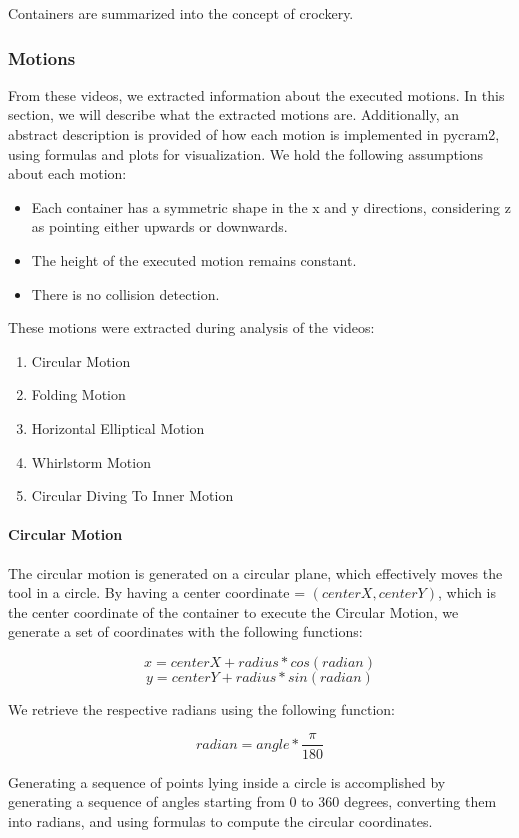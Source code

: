 Containers are summarized into the concept of crockery. 
\subsubsection{Motions}
From these videos, we extracted information about the executed motions. In this section, we will describe what the extracted motions are. 
Additionally, an abstract description is provided of how each motion is implemented in pycram2, using formulas and plots for visualization.
We hold the following assumptions about each motion:

\begin{itemize}
  \item Each container has a symmetric shape in the x and y directions, considering z as pointing either upwards or downwards.
  \item The height of the executed motion remains constant.
  \item There is no collision detection.
\end{itemize}

These motions were extracted during analysis of the videos:

\begin{enumerate}
  \item Circular Motion
  \item Folding Motion
  \item Horizontal Elliptical Motion
  \item Whirlstorm Motion
  \item Circular Diving To Inner Motion 
\end{enumerate}

\paragraph{Circular Motion}
The circular motion is generated on a circular plane, which effectively moves the tool in a circle. 
By having a center coordinate = $(centerX, centerY)$, which is the center coordinate of 
the container to execute the Circular Motion, we generate a set of coordinates
with the following functions: 

\[x = centerX + radius * cos(radian)\]
\[y = centerY + radius * sin(radian)\]

We retrieve the respective radians using the following function:

\[radian = angle * \frac{\pi}{180}\]

Generating a sequence of points lying inside a circle is accomplished by generating a sequence of angles starting from 0 to 360 degrees, 
converting them into radians, and using formulas to compute the circular coordinates.

